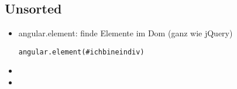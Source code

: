 \subsection{Unsorted}
\begin{itemize}
  \item angular.element: finde Elemente im Dom (ganz wie jQuery)
    \begin{verbatim}
angular.element(#ichbineindiv)
    \end{verbatim}
  \item
  \item
\end{itemize}




